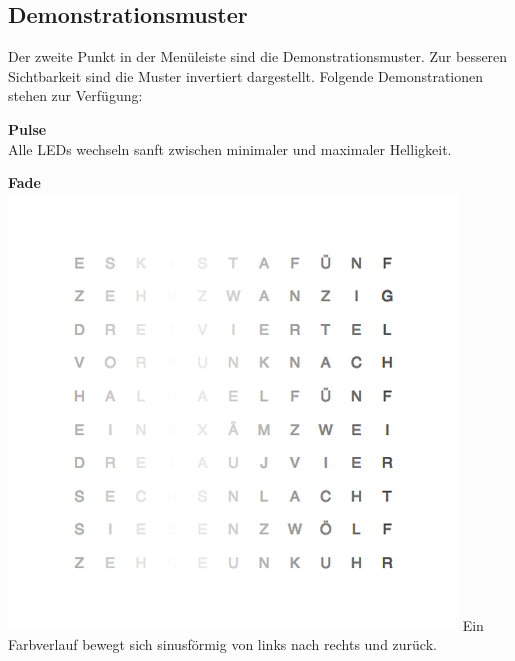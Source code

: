 \begin{multicols}{2}
\subsection{Demonstrationsmuster}
Der zweite Punkt in der Menüleiste sind die Demonstrationsmuster. Zur besseren Sichtbarkeit sind die Muster invertiert dargestellt. Folgende Demonstrationen stehen zur Verfügung:

\textbf{Pulse} \\
Alle LEDs wechseln sanft zwischen minimaler und maximaler Helligkeit.

\textbf{Fade} \\
\includegraphics[width=\columnwidth]{Abbildungen/Software/Demo/Fade}
Ein Farbverlauf bewegt sich sinusförmig von links nach rechts und zurück.


\end{multicols}
